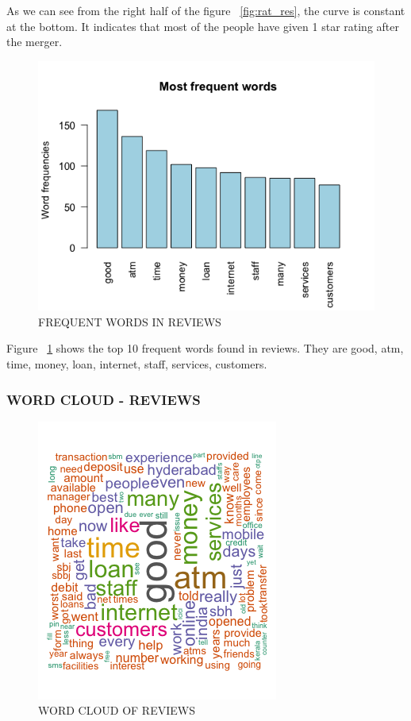 \documentclass[a4paper, 12pt]{extarticle}
\begin{document}
{As we can see from the right half of the figure ~\ref{fig:rat_res}, the curve is constant at the bottom. It indicates that most of the people have given 1 star rating after the merger.

\begin{figure}[H]
\centering
\includegraphics[scale=0.5]{freq_words.png}
\caption{FREQUENT WORDS IN REVIEWS}
\label{fig:freq_words}
\end{figure}

Figure ~\ref{fig:freq_words} shows the top 10 frequent words found in reviews. They are good, atm, time, money, loan, internet, staff, services, customers.


\subsubsection{WORD CLOUD - REVIEWS}
\begin{figure}[H]
\centering
\includegraphics[scale=1]{wordcloud_reviews.png}
\caption{WORD CLOUD OF REVIEWS}
\end{figure}

}
\end{document}
